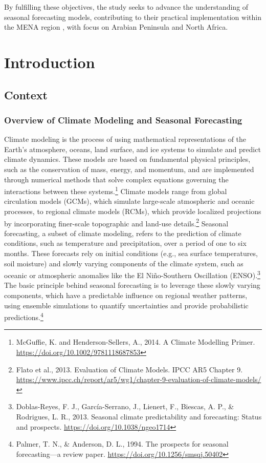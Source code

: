 By fulfilling these objectives, the study seeks to advance the understanding of seasonal forecasting models, contributing to their practical implementation within the MENA region  , with focus on  Arabian Peninsula and North Africa.





\chapter{Introduction}
\section{Context}
\subsection{Overview of Climate Modeling and Seasonal Forecasting}

Climate modeling is the process of using mathematical representations of the Earth’s atmosphere, oceans, land surface, and ice systems to simulate and predict climate dynamics. These models are based on fundamental physical principles, such as the conservation of mass, energy, and momentum, and are implemented through numerical methods that solve complex equations governing the interactions between these systems.\footnote{McGuffie, K. and Henderson-Sellers, A., 2014. A Climate Modelling Primer. \url{https://doi.org/10.1002/9781118687853}} Climate models range from global circulation models (GCMs), which simulate large-scale atmospheric and oceanic processes, to regional climate models (RCMs), which provide localized projections by incorporating finer-scale topographic and land-use details.\footnote{Flato et al., 2013. Evaluation of Climate Models. IPCC AR5 Chapter 9. \url{https://www.ipcc.ch/report/ar5/wg1/chapter-9-evaluation-of-climate-models/}} Seasonal forecasting, a subset of climate modeling, refers to the prediction of climate conditions, such as temperature and precipitation, over a period of one to six months. These forecasts rely on initial conditions (e.g., sea surface temperatures, soil moisture) and slowly varying components of the climate system, such as oceanic or atmospheric anomalies like the El Niño-Southern Oscillation (ENSO).\footnote{Doblas-Reyes, F. J., García-Serrano, J., Lienert, F., Biescas, A. P., \& Rodrigues, L. R., 2013. Seasonal climate predictability and forecasting: Status and prospects. \url{https://doi.org/10.1038/ngeo1714}} The basic principle behind seasonal forecasting is to leverage these slowly varying components, which have a predictable influence on regional weather patterns, using ensemble simulations to quantify uncertainties and provide probabilistic predictions.\footnote{Palmer, T. N., \& Anderson, D. L., 1994. The prospects for seasonal forecasting—a review paper. \url{https://doi.org/10.1256/smsqj.50402}}  

